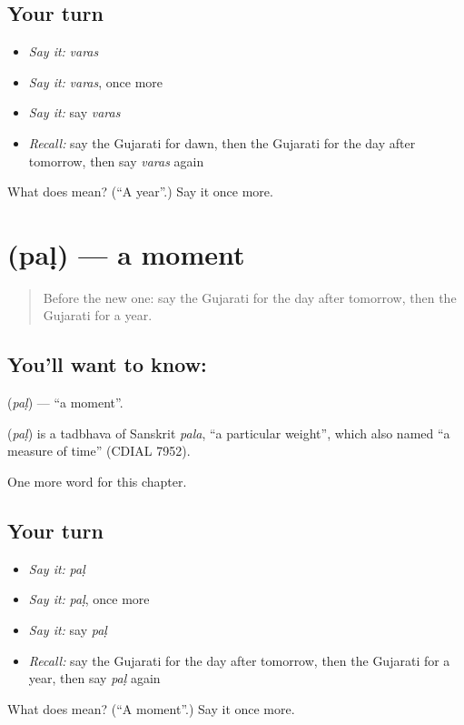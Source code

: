 \subsection*{Your turn}
\begin{itemize}
\raggedright
  \item \emph{Say it:} \emph{varas}
  \item \emph{Say it:} \emph{varas}, once more
  \item \emph{Say it:} say \emph{varas}
  \item \emph{Recall:} say the Gujarati for dawn, then the Gujarati for the day after tomorrow, then say \emph{varas} again
\end{itemize}

\begin{tcolorbox}[breakable,colback=teal!4,colframe=teal!35!black,title={Before you move on}]
What does  mean? (\textquotedblleft{}A year\textquotedblright{}.) Say it once more.
\end{tcolorbox}
\section[\texorpdfstring{\gu{પળ} (paḷ)}{પળ (paḷ)}]{ (paḷ) — a moment}

\label{lesson:GU-C92-pal}



\begin{quote}
Before the new one: say the Gujarati for the day after tomorrow, then the Gujarati for a year.
\end{quote}

\subsection*{You'll want to know: }
\textbf{} (\emph{paḷ}) — \textquotedblleft{}a moment\textquotedblright{}.

\begin{cousinweb}
\textbf{} (\emph{paḷ}) is a tadbhava of Sanskrit \emph{pala}, \textquotedblleft{}a particular weight\textquotedblright{}, which also named \textquotedblleft{}a measure of time\textquotedblright{} (CDIAL 7952).
\end{cousinweb}

\begin{grammarlens}[title={What you've built}]
One more word for this chapter.
\end{grammarlens}

\subsection*{Your turn}
\begin{itemize}
\raggedright
  \item \emph{Say it:} \emph{paḷ}
  \item \emph{Say it:} \emph{paḷ}, once more
  \item \emph{Say it:} say \emph{paḷ}
  \item \emph{Recall:} say the Gujarati for the day after tomorrow, then the Gujarati for a year, then say \emph{paḷ} again
\end{itemize}

\begin{tcolorbox}[breakable,colback=teal!4,colframe=teal!35!black,title={Before you move on}]
What does  mean? (\textquotedblleft{}A moment\textquotedblright{}.) Say it once more.
\end{tcolorbox}
